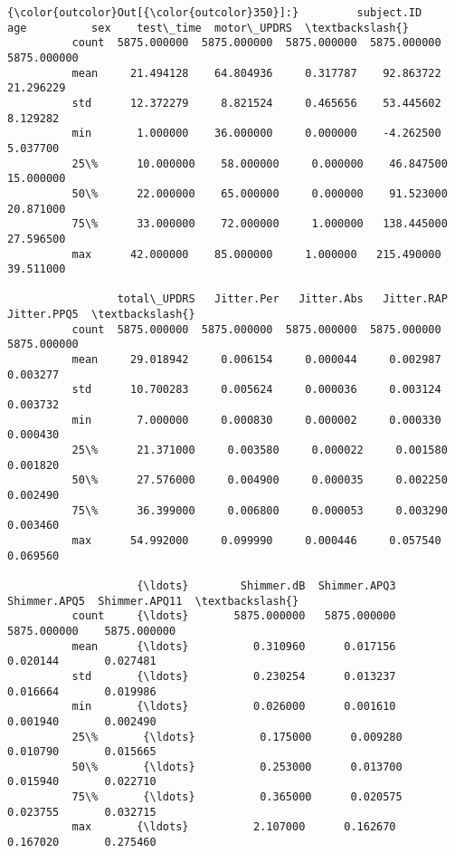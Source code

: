\documentclass[11pt]{article}
\begin{document}
\begin{Verbatim}[commandchars=\\\{\}]
{\color{outcolor}Out[{\color{outcolor}350}]:}         subject.ID          age          sex    test\_time  motor\_UPDRS  \textbackslash{}
          count  5875.000000  5875.000000  5875.000000  5875.000000  5875.000000   
          mean     21.494128    64.804936     0.317787    92.863722    21.296229   
          std      12.372279     8.821524     0.465656    53.445602     8.129282   
          min       1.000000    36.000000     0.000000    -4.262500     5.037700   
          25\%      10.000000    58.000000     0.000000    46.847500    15.000000   
          50\%      22.000000    65.000000     0.000000    91.523000    20.871000   
          75\%      33.000000    72.000000     1.000000   138.445000    27.596500   
          max      42.000000    85.000000     1.000000   215.490000    39.511000   
          
                 total\_UPDRS   Jitter.Per   Jitter.Abs   Jitter.RAP  Jitter.PPQ5  \textbackslash{}
          count  5875.000000  5875.000000  5875.000000  5875.000000  5875.000000   
          mean     29.018942     0.006154     0.000044     0.002987     0.003277   
          std      10.700283     0.005624     0.000036     0.003124     0.003732   
          min       7.000000     0.000830     0.000002     0.000330     0.000430   
          25\%      21.371000     0.003580     0.000022     0.001580     0.001820   
          50\%      27.576000     0.004900     0.000035     0.002250     0.002490   
          75\%      36.399000     0.006800     0.000053     0.003290     0.003460   
          max      54.992000     0.099990     0.000446     0.057540     0.069560   
          
                    {\ldots}        Shimmer.dB  Shimmer.APQ3  Shimmer.APQ5  Shimmer.APQ11  \textbackslash{}
          count     {\ldots}       5875.000000   5875.000000   5875.000000    5875.000000   
          mean      {\ldots}          0.310960      0.017156      0.020144       0.027481   
          std       {\ldots}          0.230254      0.013237      0.016664       0.019986   
          min       {\ldots}          0.026000      0.001610      0.001940       0.002490   
          25\%       {\ldots}          0.175000      0.009280      0.010790       0.015665   
          50\%       {\ldots}          0.253000      0.013700      0.015940       0.022710   
          75\%       {\ldots}          0.365000      0.020575      0.023755       0.032715   
          max       {\ldots}          2.107000      0.162670      0.167020       0.275460   
          

\end{Verbatim}
\end{document}
